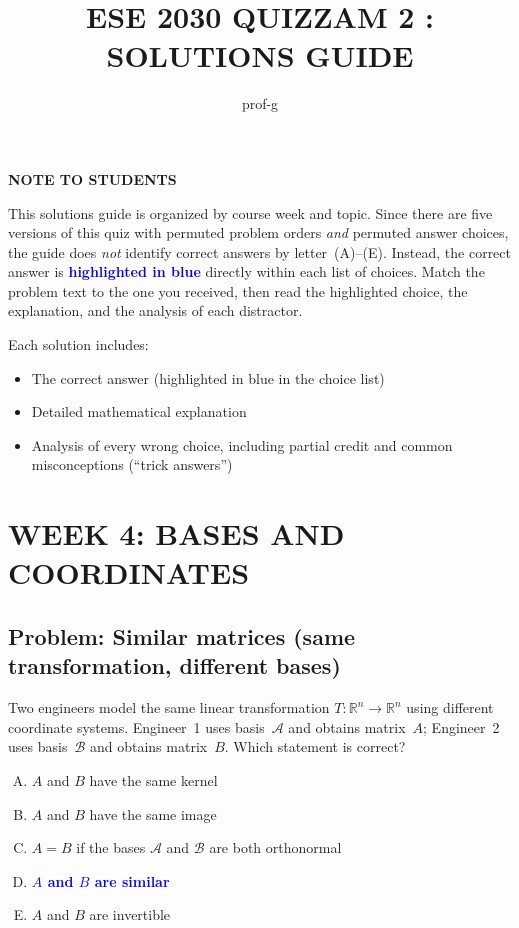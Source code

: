\documentclass[12pt]{amsart}
\title{ESE 2030 QUIZZAM 2 : SOLUTIONS GUIDE}
\author{prof-g}
\begin{document}
\maketitle

\begin{center}
{\bf NOTE TO STUDENTS}
\end{center}

This solutions guide is organized by course week and topic.
Since there are five versions of this quiz with permuted problem orders \emph{and}
permuted answer choices, the guide does \emph{not} identify correct answers by
letter~(A)--(E).
Instead, the correct answer is \textcolor{blue}{\textbf{highlighted in blue}}
directly within each list of choices.
Match the problem text to the one you received, then read the highlighted
choice, the explanation, and the analysis of each distractor.

Each solution includes:
\begin{itemize}
\item The correct answer (highlighted in blue in the choice list)
\item Detailed mathematical explanation
\item Analysis of every wrong choice, including partial credit and common misconceptions (``trick answers'')
\end{itemize}

\newpage

\section*{WEEK 4: BASES AND COORDINATES}

\subsection*{Problem: Similar matrices (same transformation, different bases)}

Two engineers model the same linear transformation $T:\mathbb{R}^n\to\mathbb{R}^n$
using different coordinate systems.
Engineer~1 uses basis~$\mathcal{A}$ and obtains matrix~$A$; Engineer~2 uses
basis~$\mathcal{B}$ and obtains matrix~$B$. Which statement is correct?

\begin{enumerate}[(A)]
\item $A$ and $B$ have the same kernel
\item $A$ and $B$ have the same image
\item $A=B$ if the bases $\mathcal{A}$ and $\mathcal{B}$ are both orthonormal
\item \textcolor{blue}{\textbf{$A$ and $B$ are similar}}
\item $A$ and $B$ are invertible
\end{enumerate}
\end{document}
